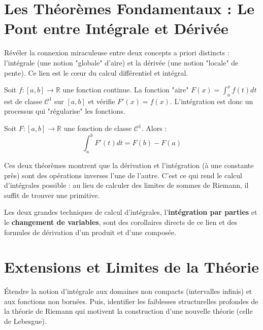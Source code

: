 \section{Les Théorèmes Fondamentaux : Le Pont entre Intégrale et Dérivée}

\begin{objectif}
    Révéler la connexion miraculeuse entre deux concepts a priori distincts : l'intégrale (une notion "globale" d'aire) et la dérivée (une notion "locale" de pente). Ce lien est le cœur du calcul différentiel et intégral.
\end{objectif}

\begin{theorem}
    Soit $f: [a,b] \to \mathbb{R}$ une fonction continue. La fonction "aire" $F(x) = \int_a^x f(t) dt$ est de classe $\mathcal{C}^1$ sur $[a,b]$ et vérifie $F'(x) = f(x)$. L'intégration est donc un processus qui "régularise" les fonctions.
\end{theorem}

\begin{theorem}
    Soit $F: [a,b] \to \mathbb{R}$ une fonction de classe $\mathcal{C}^1$. Alors :
    $$ \int_a^b F'(t) dt = F(b) - F(a) $$
\end{theorem}
\begin{remark}
    Ces deux théorèmes montrent que la dérivation et l'intégration (à une constante près) sont des opérations inverses l'une de l'autre. C'est ce qui rend le calcul d'intégrales possible : au lieu de calculer des limites de sommes de Riemann, il suffit de trouver une primitive.
\end{remark}

\begin{application}
    Les deux grandes techniques de calcul d'intégrales, l'\textbf{intégration par parties} et le \textbf{changement de variables}, sont des corollaires directs de ce lien et des formules de dérivation d'un produit et d'une composée.
\end{application}

\section{Extensions et Limites de la Théorie}

\begin{objectif}
    Étendre la notion d'intégrale aux domaines non compacts (intervalles infinis) et aux fonctions non bornées. Puis, identifier les faiblesses structurelles profondes de la théorie de Riemann qui motivent la construction d'une nouvelle théorie (celle de Lebesgue).
\end{objectif}

